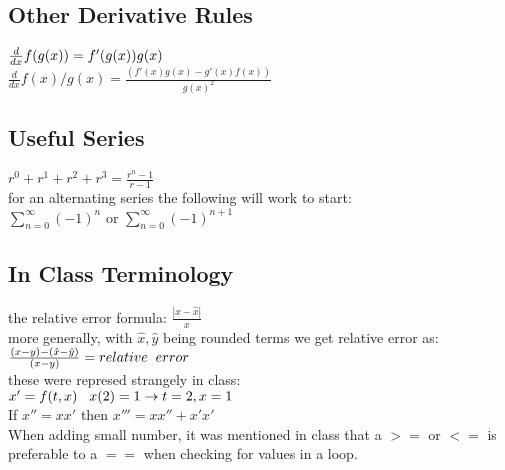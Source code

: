 \subsection*{Other Derivative Rules}
$\frac{d}{dx} f(g(x)) = f'(g(x))g(x) \hspace{1mm}$\\
$\frac{d}{dx} f(x)/g(x) = \frac{(f'(x)g(x) - g'(x)f(x))}{g(x)^2}$\\

\subsection*{Useful Series}
$r^0 + r^1 + r^2 + r^3 = \frac{r^n - 1}{r - 1}$\\
for an alternating series the following will work to start:\\
$ \sum_{n=0}^{\infty} (-1)^n $ or $ \sum_{n=0}^{\infty} (-1)^{n+1} $\\

\subsection*{In Class Terminology}
the relative error formula:
$ \frac{|x - \hat{x}|}{x} $\\
more generally, with $\hat{x},\hat{y}$ being rounded terms we get relative error as:\\
$\frac{(x-y) - (\hat{x}-\hat{y})}{(x-y)} = relative \hspace{2mm} error$\\
these were represed strangely in class:\\
$ x' = f(t,x)  \hspace{3mm} x(2) = 1 \rightarrow t = 2, x=1 $\\
If $x'' =  xx'$ then $x''' = xx'' + x'x'$\\
When adding small number, it was mentioned in class that a $>=$ or $<=$ is
preferable to a $==$ when checking for values in a loop.
